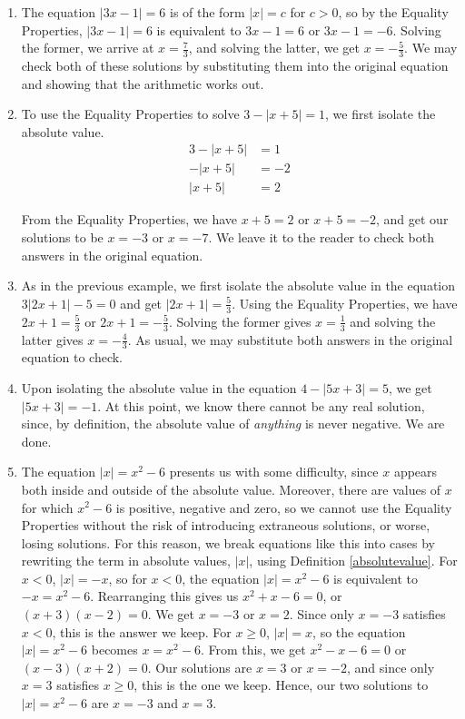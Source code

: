 {
\begin{enumerate}

\item  The equation  $|3x-1| = 6$ is of the form $|x| = c$ for $c>0$, so by the Equality Properties, $|3x-1| = 6$ is equivalent to $3x-1=6$ or $3x-1 = -6$.  Solving the former, we arrive at $x = \frac{7}{3}$, and solving the latter, we get $x = -\frac{5}{3}$.  We may check both of these solutions by substituting them into the original equation and showing that the arithmetic works out.

\item  To use the Equality Properties to solve $3 - |x+5| = 1$, we first isolate the absolute value. 
\begin{align*}
3 - |x+5| & =  1 \\
-|x+5| & =  -2  \tag*{subtract $3$} \\
|x+5| & =  2 \tag*{divide by $-1$}  
\end{align*}

From the Equality Properties, we have $x+5 = 2$ or $x+5 = -2$, and get our solutions to be $x = -3$ or $x = -7$.  We leave it to the reader to check both answers in the original equation.

\item As in the previous example, we first isolate the absolute value in the equation $3|2x+1| - 5 = 0$ and get $|2x+1| = \frac{5}{3}$.  Using the Equality Properties, we have $2x+1 = \frac{5}{3}$ or $2x+1 = -\frac{5}{3}$.  Solving the former gives $x = \frac{1}{3}$ and solving the latter gives $x = -\frac{4}{3}$.  As usual, we may substitute both answers in the original equation to check.

\item  Upon isolating the absolute value in the equation $4 - |5x+3| = 5$, we get $|5x+3| = -1$.  At this point, we know there cannot be any real solution, since, by definition, the absolute value of \textit{anything} is never negative.  We are done. 


\item  The equation  $|x| = x^2-6$ presents us with some difficulty, since $x$ appears both inside and outside of the absolute value. Moreover, there are values of $x$ for which $x^2-6$ is positive, negative and zero, so we cannot use the Equality Properties without the risk of introducing extraneous solutions, or worse, losing solutions.  For this reason, we break equations like this into cases  by rewriting the term in absolute values, $|x|$, using Definition \ref{absolutevalue}.  For $x < 0$, $|x| = -x$, so for $x < 0$, the equation $|x| = x^2-6$ is equivalent to $-x = x^2-6$.  Rearranging this gives us $x^2+x-6 = 0$, or $(x+3)(x-2) = 0$.  We get $x = -3$ or $x=2$.  Since only $x=-3$ satisfies $x<0$, this is the answer we keep. For $x \geq 0$, $|x| = x$, so the equation $|x| = x^2-6$ becomes $x = x^2-6$.  From this, we get $x^2-x-6 =0$ or $(x-3)(x+2) = 0$.  Our solutions are $x=3$ or $x = -2$, and since only $x=3$ satisfies $x \geq 0$, this is the one we keep.  Hence, our two solutions to $|x| = x^2-6$ are $x=-3$ and $x=3$.


\end{enumerate}}
